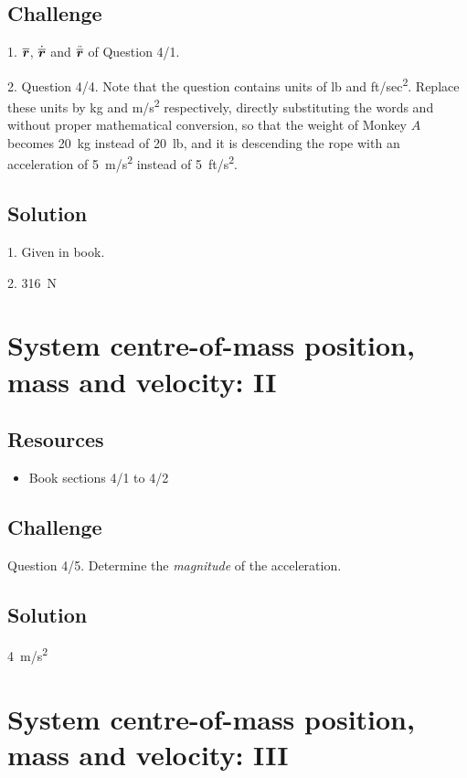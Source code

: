 \subsection*{Challenge}
1. $\bm{\overline{r}}$, $\dot{\bm{\overline{r}}}$ and $\ddot{\bm{\overline{r}}}$ of Question 4/1.

2. Question 4/4. Note that the question contains units of \si{lb} and \si{ft/sec^2}. Replace these units by \si{kg} and \si{m/s^2} respectively, directly substituting the words and without proper mathematical conversion, so that the weight of Monkey $A$ becomes \SI{20}{kg} instead of \SI{20}{lb}, and it is descending the rope with an acceleration of \SI{5}{m/s^2} instead of \SI{5}{ft/s^2}.

\subsection*{Solution}
1. Given in book.

2. \SI{316}{N}




\newpage
\section{System centre-of-mass position, mass and velocity: II}

\subsection*{Resources}
\begin{itemize}
    \item Book sections 4/1 to 4/2
\end{itemize}

\subsection*{Challenge}
Question 4/5. Determine the \emph{magnitude} of the acceleration.

\subsection*{Solution}
\SI{4}{m/s^2}




\newpage
\section{System centre-of-mass position, mass and velocity: III}

